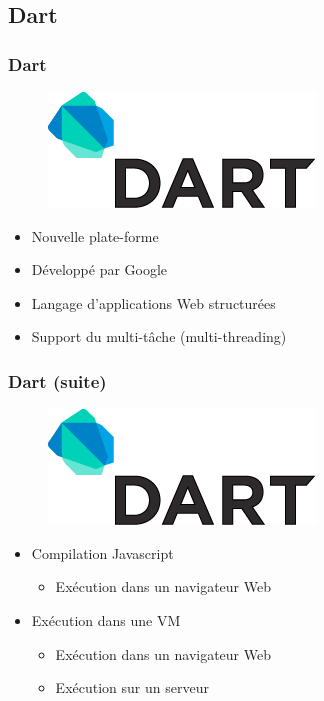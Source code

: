   \subsection*{Dart}
    \begin{frame}
      \frametitle{Dart}
      \begin{figure}
        \begin{center}
          \includegraphics[scale=0.4]{includes/dart_logo.png}
        \end{center}
      \end{figure}
      \begin{itemize}
        \item Nouvelle plate-forme
        \item Développé par Google
        \item Langage d'applications Web structurées
        \item Support du multi-tâche (multi-threading)
      \end{itemize}
    \end{frame}
    \begin{frame}
      \frametitle{Dart (suite)}
      \begin{figure}
        \begin{center}
          \includegraphics[scale=0.4]{includes/dart_logo.png}
        \end{center}
      \end{figure}
      \begin{itemize}
        \item Compilation Javascript
        \begin{itemize}
          \item Exécution dans un navigateur Web
        \end{itemize}
        \item Exécution dans une VM
        \begin{itemize}
          \item Exécution dans un navigateur Web
          \item Exécution sur un serveur
        \end{itemize}
      \end{itemize}
    \end{frame}

